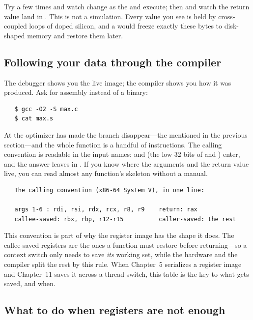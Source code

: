 Try  a few times and watch  change as the
 and  execute; then  and watch the
return value land in . This is not a simulation. Every value
you see is held by cross-coupled loops of doped silicon, and a
 would freeze exactly these bytes to disk-shaped
memory and restore them later.

\subsection{Following your data through the compiler}

The debugger shows you the live image; the compiler shows you how it
was produced. Ask  for assembly instead of a binary:

\begin{verbatim}
   $ gcc -O2 -S max.c
   $ cat max.s
\end{verbatim}

At  the optimizer has made the branch disappear---the
 mentioned in the previous section---and the whole
function is a handful of instructions. The calling convention is
readable in the input names:  and  (the low 32
bits of  and ) enter, and the answer leaves in
. If you know where the arguments and the return value
live, you can read almost any function's skeleton without a manual.

\begin{verbatim}
   The calling convention (x86-64 System V), in one line:

   args 1-6 : rdi, rsi, rdx, rcx, r8, r9    return: rax
   callee-saved: rbx, rbp, r12-r15          caller-saved: the rest
\end{verbatim}

This convention is part of why the register image has the shape it
does. The callee-saved registers are the ones a function must restore
before returning---so a context switch only needs to save \emph{its}
working set, while the hardware and the compiler split the rest by
this rule. When Chapter~5 serializes a register image and Chapter~11
saves it across a thread switch, this table is the key to what gets
saved, and when.

\subsection{What to do when registers are not enough}

